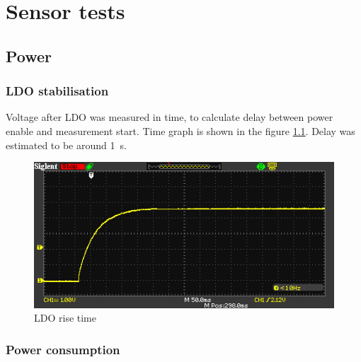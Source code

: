 \chapter{Sensor tests}


\section{Power}
    \subsection{LDO stabilisation}
        Voltage after LDO was measured in time, to calculate delay between power enable and measurement start. Time graph is shown in the figure \ref{LDO_rise_time}. Delay was estimated to be around \SI{1}{\second}.

        \begin{figure}[H]
            \centering
            \includegraphics[width=0.8\paperwidth]{img/07/rise_time.png}
            \caption{LDO rise time}
            \label{LDO_rise_time}
        \end{figure}

    \subsection{Power consumption}

